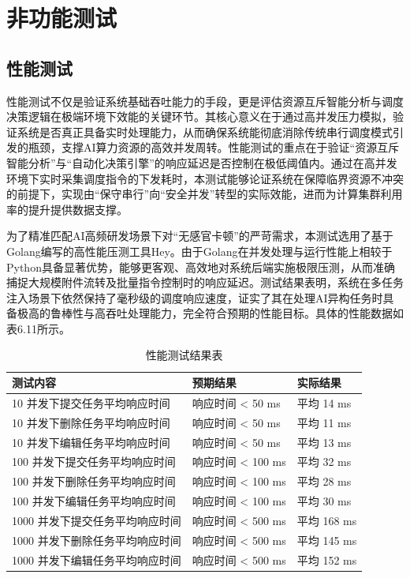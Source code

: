 \section{非功能测试}

\subsection{性能测试}

性能测试不仅是验证系统基础吞吐能力的手段，更是评估资源互斥智能分析与调度决策逻辑在极端环境下效能的关键环节。其核心意义在于通过高并发压力模拟，验证系统是否真正具备实时处理能力，从而确保系统能彻底消除传统串行调度模式引发的瓶颈，支撑AI算力资源的高效并发周转。性能测试的重点在于验证“资源互斥智能分析”与“自动化决策引擎”的响应延迟是否控制在极低阈值内。通过在高并发环境下实时采集调度指令的下发耗时，本测试能够论证系统在保障临界资源不冲突的前提下，实现由“保守串行”向“安全并发”转型的实际效能，进而为计算集群利用率的提升提供数据支撑。

为了精准匹配AI高频研发场景下对“无感官卡顿”的严苛需求，本测试选用了基于 Golang编写的高性能压测工具Hey。由于Golang在并发处理与运行性能上相较于Python具备显著优势\cite{wang2023}，能够更客观、高效地对系统后端实施极限压测，从而准确捕捉大规模附件流转及批量指令控制时的响应延迟。测试结果表明，系统在多任务注入场景下依然保持了毫秒级的调度响应速度，证实了其在处理AI异构任务时具备极高的鲁棒性与高吞吐处理能力，完全符合预期的性能目标。具体的性能数据如表6.11所示。

\begin{table}[htbp]
\centering
\caption{性能测试结果表}
\begin{tabular}{lll}
\toprule
测试内容 & 预期结果 & 实际结果 \\
\midrule
10 并发下提交任务平均响应时间 & 响应时间 < 50 ms & 平均 14 ms \\
10 并发下删除任务平均响应时间 & 响应时间 < 50 ms & 平均 11 ms \\
10 并发下编辑任务平均响应时间 & 响应时间 < 50 ms & 平均 13 ms \\
100 并发下提交任务平均响应时间 & 响应时间 < 100 ms & 平均 32 ms \\
100 并发下删除任务平均响应时间 & 响应时间 < 100 ms & 平均 28 ms \\
100 并发下编辑任务平均响应时间 & 响应时间 < 100 ms & 平均 30 ms \\
1000 并发下提交任务平均响应时间 & 响应时间 < 500 ms & 平均 168 ms \\
1000 并发下删除任务平均响应时间 & 响应时间 < 500 ms & 平均 145 ms \\
1000 并发下编辑任务平均响应时间 & 响应时间 < 500 ms & 平均 152 ms \\
\bottomrule
\end{tabular}
\label{tab:perf_concurrent}
\end{table}

